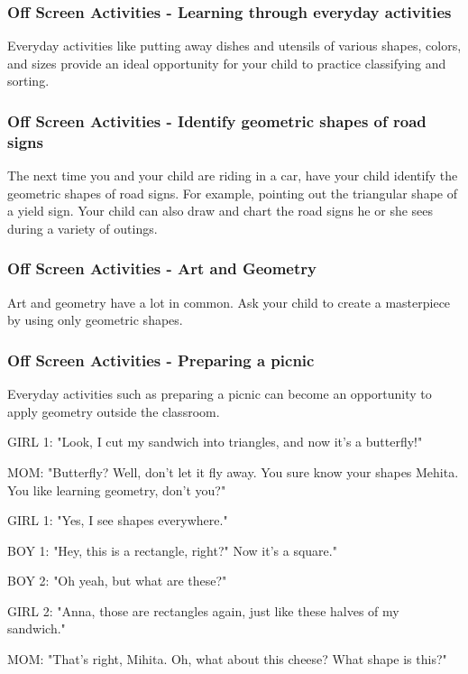 \subsubsection{Off Screen Activities - Learning through everyday activities}

Everyday activities like putting away dishes and utensils of various shapes, colors, and sizes provide an ideal opportunity for your child to practice classifying and sorting.

\subsubsection{Off Screen Activities - Identify geometric shapes of road signs}

The next time you and your child are riding in a car, have your child identify the geometric shapes of road signs.
For example, pointing out the triangular shape of a yield sign.
Your child can also draw and chart the road signs he or she sees during a variety of outings.

\subsubsection{Off Screen Activities - Art and Geometry}

Art and geometry have a lot in common.
Ask your child to create a masterpiece by using only geometric shapes.

\subsubsection{Off Screen Activities - Preparing a picnic}

Everyday activities such as preparing a picnic can become an opportunity to apply geometry outside the classroom.

GIRL 1: "Look, I cut my sandwich into triangles, and now it's a butterfly!"

MOM: "Butterfly? Well, don't let it fly away.
You sure know your shapes Mehita.
You like learning geometry, don't you?"

GIRL 1: "Yes, I see shapes everywhere."

BOY 1: "Hey, this is a rectangle, right?"
Now it's a square."

BOY 2: "Oh yeah, but what are these?"

GIRL 2: "Anna, those are rectangles again, just like these halves of my sandwich."

MOM: "That's right, Mihita.
Oh, what about this cheese?
What shape is this?"

